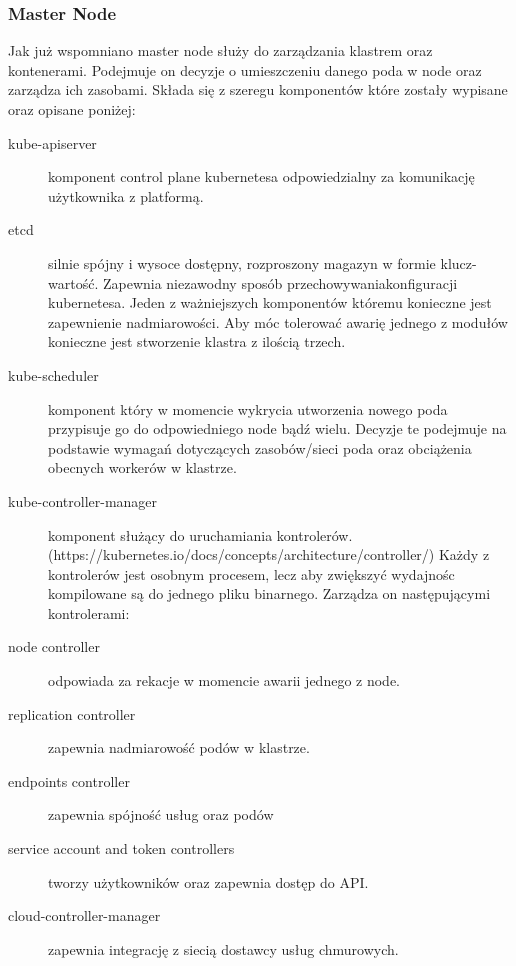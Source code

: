 \documentclass[pl,final,oneside]{mgr} %
\begin{document}
\subsubsection{Master Node}
Jak już wspomniano master node służy do zarządzania klastrem oraz kontenerami. Podejmuje on decyzje o umieszczeniu danego poda w node oraz zarządza ich zasobami. Składa się z szeregu komponentów które zostały wypisane oraz opisane poniżej:
\begin{description}
	\item [kube-apiserver] komponent control plane kubernetesa odpowiedzialny za komunikację użytkownika z platformą. 
	\item [etcd] silnie spójny i wysoce dostępny, rozproszony magazyn w formie klucz-wartość. Zapewnia niezawodny sposób przechowywaniakonfiguracji kubernetesa. Jeden z ważniejszych komponentów któremu konieczne jest zapewnienie nadmiarowości. Aby móc tolerować awarię jednego z modułów konieczne jest stworzenie klastra z ilością trzech.
	\item [kube-scheduler] komponent który w momencie wykrycia utworzenia nowego poda przypisuje go do odpowiedniego node bądź wielu. Decyzje te podejmuje na podstawie wymagań dotyczących zasobów/sieci poda oraz obciążenia obecnych workerów w klastrze. 
	\item [kube-controller-manager] komponent służący do uruchamiania kontrolerów. (https://kubernetes.io/docs/concepts/architecture/controller/) Każdy z kontrolerów jest osobnym procesem, lecz aby zwiększyć wydajnośc kompilowane są do jednego pliku binarnego. Zarządza on następującymi kontrolerami:
	\item [node controller] odpowiada za rekacje w momencie awarii jednego z node.
	\item [replication controller] zapewnia nadmiarowość podów w klastrze.
	\item [endpoints controller] zapewnia spójność usług oraz podów
	\item [service account and token controllers] tworzy użytkowników oraz zapewnia dostęp do API.
	\item [cloud-controller-manager] zapewnia integrację z siecią dostawcy usług chmurowych. 
\end{description}
\end{document}

